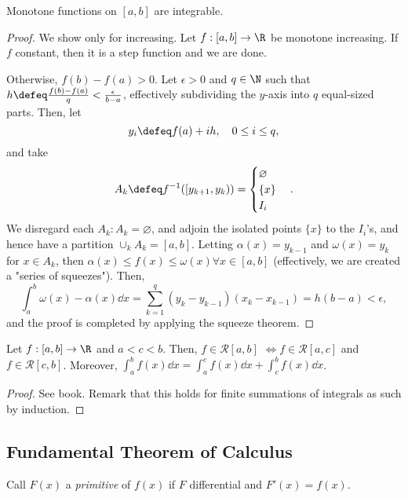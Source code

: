 \begin{theorem}[BS-7.2.7]
    Monotone functions on $[a, b]$ are integrable.
\end{theorem}

\begin{proof}
    We show only for increasing. Let $f: [a, b] \to \R$ be monotone increasing. If $f$ constant, then it is a step function and we are done.

    Otherwise, $f(b) - f(a) > 0$. Let $\epsilon > 0$ and $q \in \N$ such that $h \defeq \frac{f(b)-f(a)}{q} < \frac{\epsilon}{b-a}$, effectively subdividing the $y$-axis into $q$ equal-sized parts. Then, let \[
    y_i \defeq f(a) + i h, \quad 0 \leq i \leq q,    
    \]
    and take $$A_k \defeq f^{-1}([y_{k+1}, y_k)) = \begin{cases}
        \varnothing\\
        \{x\}\\
        I_i
    \end{cases}.$$
    We disregard each $A_k : A_k = \varnothing$, and adjoin the isolated points $\{x\}$ to the $I_i$'s, and hence have a partition $\cup_k A_k = [a, b]$. Letting $\alpha(x) = y_{k-1}$ and $\omega(x) = y_k$ for $x \in A_k$, then $\alpha(x) \leq f(x) \leq \omega(x) \forall x \in [a, b]$ (effectively, we are created a "series of squeezes"). Then, \[
    \int_{a}^b \omega(x) - \alpha(x) \dd{x} = \sum_{k=1}^q (y_k - y_{k-1})(x_k-x_{k-1}) = h (b-a) < \epsilon,
    \]
    and the proof is completed by applying the squeeze theorem.
\end{proof}

\begin{theorem}[Additivity; BS-7.2.8]
    Let $f : [a, b] \to \R$ and $a < c < b$. Then,  $f \in \mathcal{R}[a, b]$ $\iff f \in \mathcal{R}[a, c]$ and $f \in \mathcal{R}[c, b]$. Moreover, $\int_a^b f(x) \dd{x} = \int_a^c f(x) \dd{x} + \int_c^b f(x) \dd{x}$.
\end{theorem}

\begin{proof}
    See book. Remark that this holds for finite summations of integrals as such by induction.
\end{proof}

\subsection{Fundamental Theorem of Calculus}

\begin{definition}
    Call $F(x)$ a \emph{primitive} of $f(x)$ if $F$ differential and $F'(x) = f(x)$.
\end{definition}

